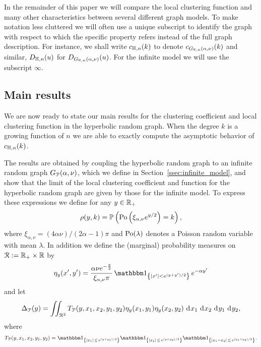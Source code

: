 
\begin{remark}\label{rmk:notation}
In the remainder of this paper we will compare the local clustering function and many other characteristics between several different graph models. To make notation less cluttered we will often use a unique subscript to identify the graph with respect to which the specific property refers instead of the full graph description. For instance, we shall write $c_{\mathbb{H},n}(k)$ to denote $c_{G_{\mathbb{H},n}(\alpha, \nu)}(k)$ and similar, $D_{\mathbb{H}, n}(u)$ for $D_{G_{\mathbb{H},n}(\alpha, \nu)}(u)$. For the infinite model we will use the subscript $\infty$.
\end{remark}


\subsection{Main results}\label{ssec:main_results}

We are now ready to state our main results for the clustering coefficient and local clustering function in the hyperbolic random graph. When the degree $k$ is a growing function of $n$ we are able to exactly compute the asymptotic behavior of $c_{\mathbb{H},n}(k)$. 

The results are obtained by coupling the hyperbolic random graph to an infinite random graph $G_{{\mathcal P}}(\alpha,\nu)$, which we define in Section~\ref{ssec:infinite_model}, and show that the limit of the local clustering coefficient and function for the hyperbolic random graph are given by those for the infinite model. To express these expressions we define for any $y \in {\ensuremath{\mathbb R}}_+$ 
\[
	\rho(y,k) = \mathbb{P}\left({\mathrm{Po}}\left(\xi_{\alpha,\nu} e^{y/2}\right) = k\right),
\]
where $\xi_{\alpha,\nu} = (4\alpha \nu)/(2\alpha - 1)\pi$ and ${\mathrm{Po}}(\lambda)$ denotes a Poisson random variable with mean $\lambda$. In addition we define the (marginal) probability measures on ${\mathcal R} := {\mathbb R}_+ \times {\ensuremath{\mathbb R}}$ by  
\[
	\eta_{y}(x^\prime, y^\prime) = \frac{\alpha \nu e^{-\frac{y}{2}}}{\xi_{\alpha,\nu} \pi} \, \ind{|x^\prime|<e^{(y+y^\prime)/2}} \, e^{-\alpha y^\prime}
\]	
and let
\begin{equation}\label{eq:def_delta_p}
	\Delta_{{\mathcal P}}(y) = \iint_{{\mathcal R}^2} T_{{\mathcal P}}(y, x_1, x_2, y_1, y_2) \eta_{y}(x_1,y_1)\eta_{y}(x_2,y_2) \operatorname{\, \mathrm{d}\hspace{-1pt}} x_1 \operatorname{\, \mathrm{d}\hspace{-1pt}} x_2  \operatorname{\, \mathrm{d}\hspace{-1pt}} y_1  \operatorname{\, \mathrm{d}\hspace{-1pt}} y_2,
\end{equation}
where 
\[
	T_\Pcal(y, x_1, x_2, y_1, y_2) 
	= \ind{|x_1| \, \le \, e^{(y+y_1)/2}}\ind{|x_2| \, \le \, e^{(y+y_2)/2}}\ind{|x_1-x_2| \, \le \, e^{(y_1+y_2)/2}}.
\]

